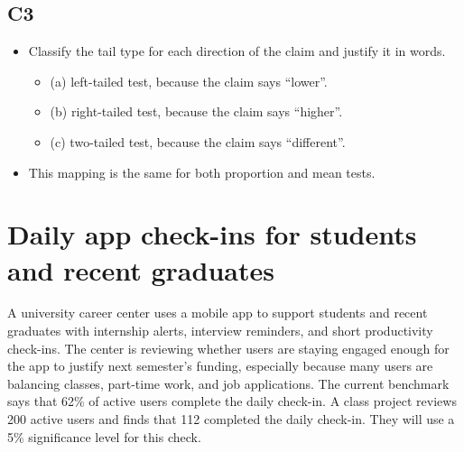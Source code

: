 	\subsection*{C3}
	\begin{itemize}
		\item Classify the tail type for each direction of the claim and justify it in words.
		\begin{itemize}
			\item (a) left-tailed test, because the claim says ``lower''.\LeftTailGraph
			\item (b) right-tailed test, because the claim says ``higher''.\RightTailGraph
			\item (c) two-tailed test, because the claim says ``different''.\TwoTailGraph
		\end{itemize}
		\item This mapping is the same for both proportion and mean tests.
	\end{itemize}

	\section{Daily app check-ins for students and recent graduates}
		A university career center uses a mobile app to support students and recent graduates with internship alerts, interview reminders, and short productivity check-ins. The center is reviewing whether users are staying engaged enough for the app to justify next semester's funding, especially because many users are balancing classes, part-time work, and job applications. The current benchmark says that 62\% of active users complete the daily check-in. A class project reviews 200 active users and finds that 112 completed the daily check-in. They will use a 5\% significance level for this check.
		

